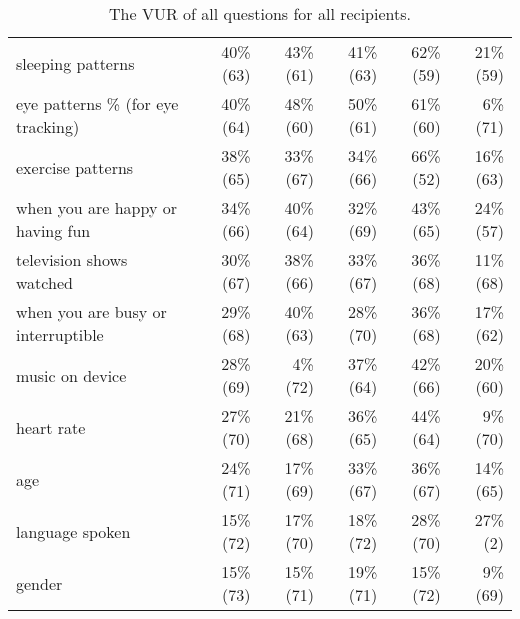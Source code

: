 \begin{table*}[t]
\begin{center}
\begin{tabular}{| l | r | r | r | r | r |}
sleeping patterns & 40\% (63) & 43\% (61) & 41\% (63) & 62\% (59) & 21\% (59) \\ 
eye patterns \% (for eye tracking) & 40\% (64) & 48\% (60) & 50\% (61) & 61\% (60) & 6\% (71) \\ 
exercise patterns & 38\% (65) & 33\% (67) & 34\% (66) & 66\% (52) & 16\% (63) \\ 
when you are happy or having fun & 34\% (66) & 40\% (64) & 32\% (69) & 43\% (65) & 24\% (57) \\ 
television shows watched & 30\% (67) & 38\% (66) & 33\% (67) & 36\% (68) & 11\% (68) \\ 
when you are busy or interruptible & 29\% (68) & 40\% (63) & 28\% (70) & 36\% (68) & 17\% (62) \\ 
music on device & 28\% (69) & 4\% (72) & 37\% (64) & 42\% (66) & 20\% (60) \\ 
heart rate & 27\% (70) & 21\% (68) & 36\% (65) & 44\% (64) & 9\% (70) \\ 
age & 24\% (71) & 17\% (69) & 33\% (67) & 36\% (67) & 14\% (65) \\ 
language spoken & 15\% (72) & 17\% (70) & 18\% (72) & 28\% (70) & 27\% (2) \\ 
gender & 15\% (73) & 15\% (71) & 19\% (71) & 15\% (72) & 9\% (69) \\ 
\hline
\end{tabular}
\caption{The VUR of all questions for all recipients.}
\label{all-vur}
\end{center}
\end{table*}